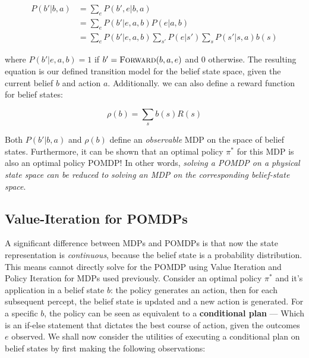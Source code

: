 \documentclass[11pt]{article}
\begin{document}
$$
\begin{aligned}
P(b'|b, a) &= \sum_e P(b', e|b, a)\\
&= \sum_{e} P(b'|e, a, b)P(e|a, b)\\
&= \sum_{e} P(b'|e, a, b)\sum_{s'} P(e|s') \sum_s P(s' | s, a)b(s)
\end{aligned}
$$

where $P(b'|e, a, b) = 1$ if $b' = \textsc{Forward}(b,a,e)$ and 0 otherwise. The resulting equation is our defined transition model for the belief state space, given the current belief $b$ and action $a$. Additionally. we can also define a reward function for belief states:

$$
\rho(b) = \sum_s b(s)R(s)
$$

Both $P(b'|b, a)$ and $\rho(b)$ define an \textit{observable} MDP on the space of belief states. Furthermore, it can be shown that an optimal policy $\pi^*$ for this MDP is also an optimal policy POMDP! In other words, \textit{solving a POMDP on a physical state space can be reduced to solving an MDP on the corresponding belief-state space}.

\subsection{Value-Iteration for POMDPs}

A significant difference between MDPs and POMDPs is that now the state representation is \textit{continuous}, because the belief state is a probability distribution. This means cannot directly solve for the POMDP using Value Iteration and Policy Iteration for MDPs used previously. Consider an optimal policy $\pi^*$ and it's application in a belief state $b$: the policy generates an action, then for each subsequent percept, the belief state is updated and a new action is generated. For a specific $b$, the policy can be seen as equivalent to a \textbf{conditional plan} --- Which is an if-else statement that dictates the best course of action, given the outcomes $e$ observed. We shall now consider the utilities of executing a conditional plan on belief states by first making the following observations:
\end{document}
